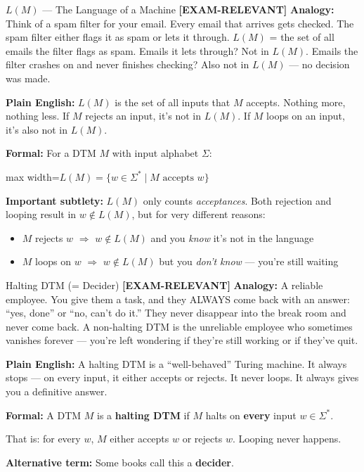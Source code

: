\documentclass[11pt,a4paper]{article}
\newcommand{\fitmath}[1]{\begin{adjustbox}{max width=\linewidth}$\displaystyle #1$\end{adjustbox}}
\newcommand{\kemark}{\textcolor{red!70!black}{\textbf{[EXAM-RELEVANT]}}}
\begin{document}
\begin{definitionbox}{$L(M)$ --- The Language of a Machine \kemark}
\textbf{Analogy:} Think of a spam filter for your email. Every email that arrives gets checked. The spam filter either flags it as spam or lets it through. $L(M)$ = the set of all emails the filter flags as spam. Emails it lets through? Not in $L(M)$. Emails the filter crashes on and never finishes checking? Also not in $L(M)$ --- no decision was made.

\textbf{Plain English:} $L(M)$ is the set of all inputs that $M$ accepts. Nothing more, nothing less. If $M$ rejects an input, it's not in $L(M)$. If $M$ loops on an input, it's also not in $L(M)$.

\textbf{Formal:} For a DTM $M$ with input alphabet $\Sigma$:
\fitmath{L(M) = \{w \in \Sigma^* \mid M \text{ accepts } w\}}

\textbf{Important subtlety:} $L(M)$ only counts \textit{acceptances}. Both rejection and looping result in $w \notin L(M)$, but for very different reasons:
\begin{itemize}[nosep]
\item $M$ rejects $w$ $\Rightarrow$ $w \notin L(M)$ and you \textit{know} it's not in the language
\item $M$ loops on $w$ $\Rightarrow$ $w \notin L(M)$ but you \textit{don't know} --- you're still waiting
\end{itemize}
\end{definitionbox}

\begin{definitionbox}{Halting DTM (= Decider) \kemark}
\textbf{Analogy:} A reliable employee. You give them a task, and they ALWAYS come back with an answer: ``yes, done'' or ``no, can't do it.'' They never disappear into the break room and never come back. A non-halting DTM is the unreliable employee who sometimes vanishes forever --- you're left wondering if they're still working or if they've quit.

\textbf{Plain English:} A halting DTM is a ``well-behaved'' Turing machine. It always stops --- on every input, it either accepts or rejects. It never loops. It always gives you a definitive answer.

\textbf{Formal:} A DTM $M$ is a \textbf{halting DTM} if $M$ halts on \textbf{every} input $w \in \Sigma^*$.

That is: for every $w$, $M$ either accepts $w$ or rejects $w$. Looping never happens.

\textbf{Alternative term:} Some books call this a \textbf{decider}.
\end{definitionbox}
\end{document}
